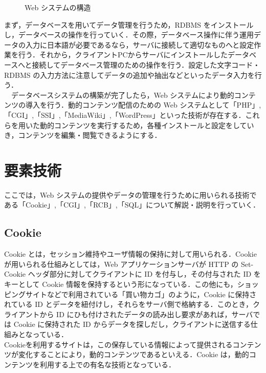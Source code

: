 \documentclass[a4j,titlepage]{jarticle}
\begin{document}
\newpage
  \begin{figure}[htbp]
    \begin{center}
      \caption{Web システムの構造}
     \label{fig:websysytem}
   \end{center}
  \end{figure}

まず，データベースを用いてデータ管理を行うため，RDBMS をインストールし，データベースの操作を行っていく．その際，データベース操作に伴う運用データの入力に日本語が必要であるなら，サーバに接続して適切なものへと設定作業を行う．それから，クライアントPCからサーバにインストールしたデータベースへと接続してデータベース管理のための操作を行う．設定した文字コード・RDBMS の入力方法に注意してデータの追加や抽出などといったデータ入力を行う．\\
　データベースシステムの構築が完了したら，Web システムにより動的コンテンツの導入を行う．動的コンテンツ配信のための Web システムとして「PHP」,「CGI」,「SSI」,「MediaWiki」,「WordPress」といった技術が存在する．これらを用いた動的コンテンツを実行するため，各種インストールと設定をしていき，コンテンツを編集・閲覧できるようにする．


\section{要素技術}
ここでは，Web システムの提供やデータの管理を行うために用いられる技術である「Cookie」,「CGI」,「RCB」,「SQL」について解説・説明を行っていく．

%
\subsection{Cookie}
Cookie とは，セッション維持やユーザ情報の保持に対して用いられる．Cookie が用いられる仕組みとしては，Web アプリケーションサーバが HTTP の Set-Cookie ヘッダ部分に対してクライアントに ID を付与し，その付与された ID をキーとして Cookie 情報を保持するという形になっている．この他にも，ショッピングサイトなどで利用されている「買い物カゴ」のように，Cookie に保持されている ID とデータを紐付けし，それらをサーバ側で格納する．このとき，クライアントから ID にひも付けされたデータの読み出し要求があれば，サーバでは Cookie に保持された ID からデータを探しだし，クライアントに送信する仕組みとなっている\cite{bib:cookietext}．\\
 Cookieを利用するサイトは，この保存している情報によって提供されるコンテンツが変化することにより，動的コンテンツであるといえる．Cookie は，動的コンテンツを利用する上での有名な技術となっている．
\end{document}
